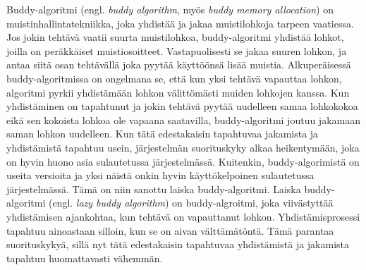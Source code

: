 Buddy-algoritmi (engl. \textit{buddy algorithm}, myös \textit{buddy memory allocation}) on muistinhallintatekniikka, joka yhdistää ja jakaa muistilohkoja tarpeen vaatiessa. Jos jokin tehtävä vaatii suurta muistilohkoa, buddy-algoritmi yhdistää lohkot, joilla on peräkkäiset muistiosoitteet. Vastapuolisesti se jakaa suuren lohkon, ja antaa siitä osan tehtävällä joka pyytää käyttöönsä lisää muistia. Alkuperäisessä buddy-algoritmissa on ongelmana se, että kun yksi tehtävä vapauttaa lohkon, algoritmi pyrkii yhdistämään lohkon välittömästi muiden lohkojen kanssa. Kun yhdistäminen on tapahtunut ja jokin tehtävä pyytää uudelleen samaa lohkokokoa eikä sen kokoista lohkoa ole vapaana saatavilla, buddy-algoritmi joutuu jakamaan saman lohkon uudelleen. Kun tätä edestakaisin tapahtuvaa jakamista ja yhdistämistä tapahtuu usein, järjestelmän suorituskyky alkaa heikentymään, joka on hyvin huono asia sulautetussa järjestelmässä. Kuitenkin, buddy-algorimistä on useita versioita ja yksi näistä onkin hyvin käyttökelpoinen sulautetussa järjestelmässä. Tämä on niin sanottu laiska buddy-algoritmi. Laiska buddy-algoritmi (engl. \textit{lazy buddy algorithm}) on buddy-algroitmi, joka viivästyttää yhdistämisen ajankohtaa, kun tehtävä on vapauttanut lohkon. Yhdistämisprosessi tapahtuu ainoastaan silloin, kun se on aivan välttämätöntä. Tämä parantaa suorituskykyä, sillä nyt tätä edestakaisin tapahtuvaa yhdistämistä ja jakamista tapahtuu huomattavasti vähemmän.\cite{soeosmm@2009}


